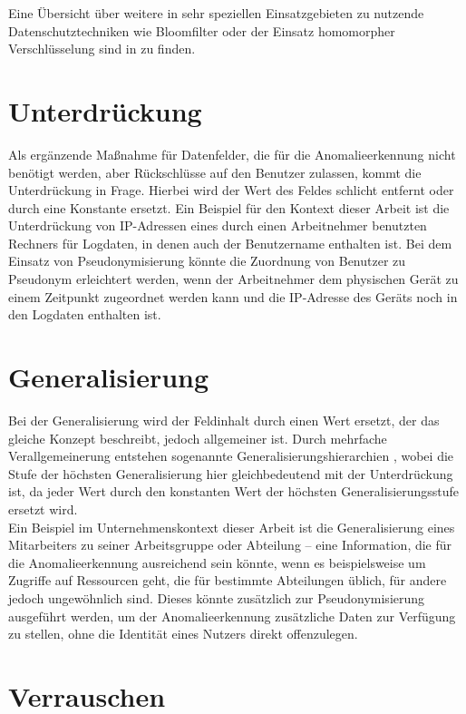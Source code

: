 Eine Übersicht über weitere in sehr speziellen Einsatzgebieten zu nutzende Datenschutztechniken wie Bloomfilter oder der Einsatz homomorpher Verschlüsselung sind in \cite{niksefat2017privacy} zu finden.

\section{Unterdrückung} %

Als ergänzende Maßnahme für Datenfelder, die für die Anomalieerkennung nicht benötigt werden, aber Rückschlüsse auf den Benutzer zulassen, kommt die Unterdrückung in Frage. Hierbei wird der Wert des Feldes schlicht entfernt oder durch eine Konstante ersetzt. Ein Beispiel für den Kontext dieser Arbeit ist die Unterdrückung von IP-Adressen eines durch einen Arbeitnehmer benutzten Rechners für Logdaten, in denen auch der Benutzername enthalten ist. Bei dem Einsatz von Pseudonymisierung könnte die Zuordnung von Benutzer zu Pseudonym erleichtert werden, wenn der Arbeitnehmer dem physischen Gerät zu einem Zeitpunkt zugeordnet werden kann und die IP-Adresse des Geräts noch in den Logdaten enthalten ist.

\section{Generalisierung}

Bei der Generalisierung wird der Feldinhalt durch einen Wert ersetzt, der das gleiche Konzept beschreibt, jedoch allgemeiner ist. Durch mehrfache Verallgemeinerung entstehen sogenannte Generalisierungshierarchien , wobei die Stufe der höchsten Generalisierung hier gleichbedeutend mit der Unterdrückung ist, da jeder Wert durch den konstanten Wert der höchsten Generalisierungsstufe ersetzt wird.\\
Ein Beispiel im Unternehmenskontext dieser Arbeit ist die Generalisierung eines Mitarbeiters zu seiner Arbeitsgruppe oder Abteilung -- eine Information, die für die Anomalieerkennung ausreichend sein könnte, wenn es beispielsweise um Zugriffe auf Ressourcen geht, die für bestimmte Abteilungen üblich, für andere jedoch ungewöhnlich sind. Dieses könnte zusätzlich zur Pseudonymisierung ausgeführt werden, um der Anomalieerkennung zusätzliche Daten zur Verfügung zu stellen, ohne die Identität eines Nutzers direkt offenzulegen.

\section{Verrauschen} %


